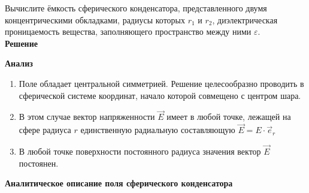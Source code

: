 \documentclass[__main__.tex]{subfiles}
\begin{document}
Вычислите ёмкость сферического конденсатора, представленного двумя концентрическими обкладками, радиусы которых $r_1$ и $r_2$, диэлектрическая проницаемость вещества, заполняющего пространство между ними $\varepsilon$.\\

\textbf{Решение}\\
\begin{figure}[h]
    \center{\texttt{[image: c-07-1]}}
\end{figure}

\textbf{Анализ}
\begin{enumerate}
    \item Поле обладает центральной симметрией. Решение целесообразно проводить в сферической системе координат, начало которой совмещено с центром шара.
    \item В этом случае вектор напряженности $\vec{E}$ имеет в любой точке, лежащей на сфере радиуса $r$  единственную радиальную составляющую $\vec{E} = E\cdot \vec{e}_r$
    \item В любой точке поверхности постоянного радиуса значения вектор $\vec{E}$ постоянен.
\end{enumerate}
\textbf{Аналитическое описание поля сферического конденсатора}
\begin{figure}[h]
    \center{\texttt{[image: c-07-2]}}
\end{figure}
\end{document}

